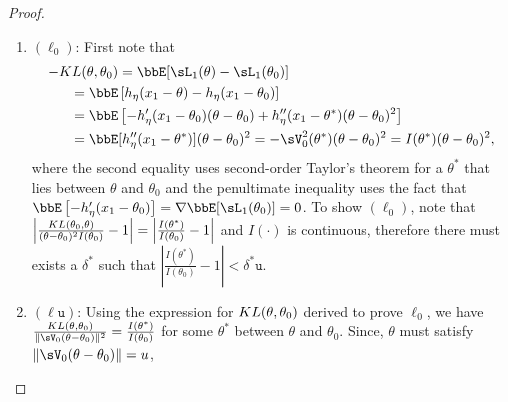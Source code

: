 \documentclass[11pt]{article}
\newcommand{\scKL}{\textsc{KL}}
\begin{document}
\begin{proof}
\begin{enumerate}
\begin{align}
        \right\}
        .
        \end{align}
        where in the first inequality, we used the mean-value theorem for $|\delta|\leq \mathtt{u}/\mathtt{h}$, and in the second inequality, we used the definition of $\Theta_0(\mathtt{u})$.
        For $\mu = \frac{\mathtt{m}}{\omega }$ such that $|\mu| \leq  \mathtt{g}_1(\mathtt{u})$, it follows from Assumption~\ref{ass:AddSG}(2), that
        \begin{align}
            \bbE &\exp\left\{
        \frac{\mathtt{m}}{\omega} \frac{\gamma^{\top}[\nabla \zeta_1(\theta) - \nabla \zeta_1(\theta_0)  ] }{ \mathtt{u} \|\sV_0 \gamma\|}
        \right\}   \leq \exp\left( \frac{v_0^2\mathtt{m}^2}{2\omega^2}  \right).
        \end{align}
        By fixing $\omega=1$, the result follows.
    \item \({(\ell_0)} \):
        First note that 
          \begin{align}
          \nonumber
              -\textsc{KL}(\theta,\theta_0)&= \bbE[\sL_1(\theta)-\sL_1(\theta_0)] 
              \\
              \nonumber
              = \bbE&\left[ h_{\eta}(x_1- \theta)- h_{\eta}(x_1- \theta_0)\right] 
              \\
              \nonumber
              =   \bbE&\left[ -h_{\eta}'(x_1- \theta_0) (\theta-\theta_0) + h_{\eta}''(x_1- \theta^*)(\theta-\theta_0)^2 \right]
              \\
              = \bbE&[h_{\eta}''(x_1- \theta^*)](\theta-\theta_0)^2 = -\sV_0^2(\theta^*)(\theta-\theta_0)^2=I(\theta^*)(\theta-\theta_0)^2,
          \end{align}
          where the second equality uses second-order Taylor's theorem for a $\theta^*$ that lies between $\theta$ and $\theta_0$ and the penultimate inequality uses the fact that $\bbE\left[ -h_{\eta}'(x_1- \theta_0)\right]= \nabla\bbE[\sL_1(\theta_0)]=0$. To show $(\ell_0)$, note that $\left|\frac{\scKL(\theta_0,\theta)}{(\theta-\theta_0)^2I(\theta_0)} -1 \right|= \left|\frac{I(\theta^*)}{I(\theta_0)}-1\right|$ and $I(\cdot)$ is continuous, therefore there must exists a $\delta^*$ such that $\left|\frac{I(\theta^*)}{I(\theta_0)}-1\right|<\delta^* \mathtt{u}$.
    \item \( {(\ell{\mathtt{u}})} \):
      Using the expression for $\textsc{KL}(\theta,\theta_0)$ derived to prove $\ell_0$, we have $\frac{\textsc{KL}(\theta,\theta_0)}{\|\sV_0 (\theta - \theta_0)\|^2} = \frac{I(\theta^*)}{I(\theta_0)}$ for some $\theta^*$ between $\theta$ and $\theta_0$. Since, $\theta$ must satisfy $\|\sV_0(\theta-\theta_0)\|=u$,

\end{enumerate}
\end{proof}
\end{document}
